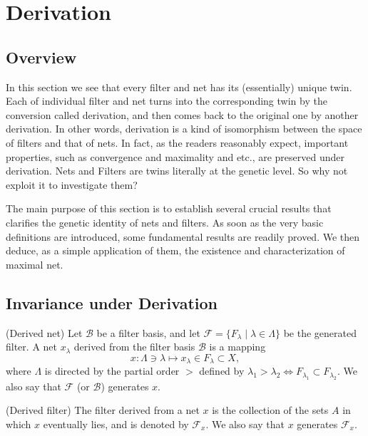 \documentclass{report}
\begin{document}
\section{Derivation}

\subsection{Overview}

In this section we see that every filter and net has its (essentially) unique twin. Each of individual filter and net turns into the corresponding twin by the conversion called derivation, and then comes back to the original one by another derivation. In other words, derivation is a kind of isomorphism between the space of filters and that of nets. In fact, as the readers reasonably expect, important properties, such as convergence and maximality and etc., are preserved under derivation. Nets and Filters are twins literally at the genetic level. So why not exploit it to investigate them?

The main purpose of this section is to establish several crucial results that clarifies the genetic identity of nets and filters. As soon as the very basic definitions are introduced, some fundamental results are readily proved. We then deduce, as a simple application of them, the existence and characterization of maximal net.

\subsection{Invariance under Derivation}

\begin{dfn} (Derived net)
    Let \( \mathscr{B} \) be a filter basis, and let \( \mathscr{F} = \{F_{\lambda} \mid \lambda \in \Lambda \} \) be the generated filter.
    A net \( x_{\lambda} \) derived from the filter basis \( \mathscr{B} \) is a mapping
    \begin{equation*}
        x: \Lambda \ni \lambda \mapsto x_{\lambda} \in F_{\lambda} \subset X,
    \end{equation*}
    where \( \Lambda \) is directed by the partial order \( > \) defined by \( \lambda_1> \lambda_2 \iff F_{\lambda_1} \subset F_{\lambda_2} \).
    We also say that \( \mathscr{F} \) (or \( \mathscr{B} \)) generates \( x \).
\end{dfn}

\begin{dfn} (Derived filter)
    The filter derived from a net \( x \) is the collection of the sets \( A \) in which \( x \) eventually lies, and is denoted by \( \mathscr{F}_x \). We also say that \( x \) generates \( \mathscr{F}_x \).
\end{dfn}
\end{document}
